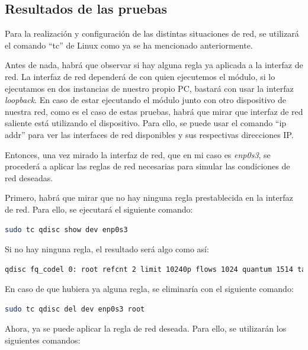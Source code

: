 \newpage

\subsection{Resultados de las pruebas}
Para la realización y configuración de las distintas situaciones de red, se utilizará el comando ``tc'' de Linux como ya se ha mencionado anteriormente. 
\vspace{\baselineskip}

Antes de nada, habrá que observar si hay alguna regla ya aplicada a la interfaz de red. La interfaz de red dependerá de con quien ejecutemos el módulo, si lo ejecutamos en dos instancias de nuestro propio PC, bastará con usar la interfaz \textit{loopback}. En caso de estar ejecutando el módulo junto con otro dispositivo de nuestra red, como es el caso de estas pruebas, habrá que mirar que interfaz de red saliente está utilizando el dispositivo. Para ello, se puede usar el comando ``ip addr'' para ver las interfaces de red disponibles y sus respectivas direcciones IP. 

\vspace{\baselineskip}
Entonces, una vez mirado la interfaz de red, que en mi caso es \textit{enp0s3}, se procederá a aplicar las reglas de red necesarias para simular las condiciones de red deseadas.

\vspace{\baselineskip}

Primero, habrá que mirar que no hay ninguna regla prestablecida en la interfaz de red. Para ello, se ejecutará el siguiente comando:
\begin{lstlisting}[language=bash]
sudo tc qdisc show dev enp0s3
\end{lstlisting}
Si no hay ninguna regla, el resultado será algo como así:
\begin{lstlisting}[language=bash, breaklines=true]
qdisc fq_codel 0: root refcnt 2 limit 10240p flows 1024 quantum 1514 target 5ms interval 100ms memory_limit 32Mb ecn drop_batch 64 
\end{lstlisting}

En caso de que hubiera ya alguna regla, se eliminaría con el siguiente comando:
\begin{lstlisting}[language=bash]
sudo tc qdisc del dev enp0s3 root
\end{lstlisting}

Ahora, ya se puede aplicar la regla de red deseada. Para ello, se utilizarán los siguientes comandos:

